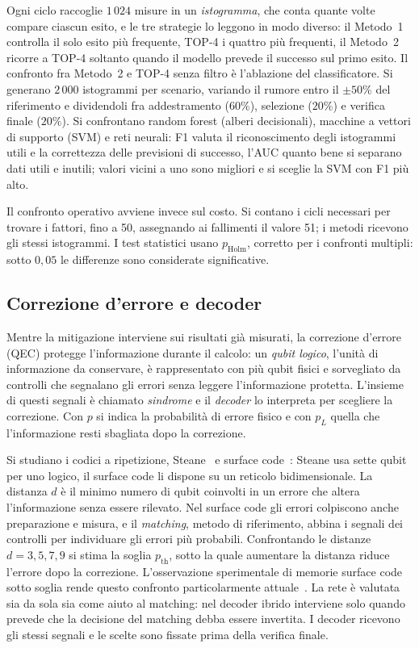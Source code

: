 Ogni ciclo raccoglie $1\,024$ misure in un \emph{istogramma}, che conta quante
volte compare ciascun esito, e le tre strategie lo leggono in modo diverso: il
Metodo~1 controlla il solo esito più frequente, TOP-4 i quattro più frequenti, il
Metodo~2 ricorre a TOP-4 soltanto quando il modello prevede il successo sul primo
esito.
Il confronto fra Metodo~2 e TOP-4 senza filtro è l'ablazione del classificatore.
Si generano $2\,000$ istogrammi per scenario, variando il rumore entro il
$\pm50\%$ del riferimento e dividendoli fra addestramento ($60\%$), selezione
($20\%$) e verifica finale ($20\%$).
Si confrontano random forest (alberi decisionali), macchine a vettori di supporto
(SVM) e reti neurali: F1 valuta il riconoscimento degli istogrammi utili e la
correttezza delle previsioni di successo, l'AUC quanto bene si separano dati
utili e inutili; valori vicini a uno sono migliori e si sceglie la SVM con F1 più
alto.

Il confronto operativo avviene invece sul costo.
Si contano i cicli necessari per trovare i fattori, fino a 50, assegnando ai
fallimenti il valore 51; i metodi ricevono gli stessi istogrammi.
I test statistici usano $p_{\mathrm{Holm}}$, corretto per i confronti multipli:
sotto $0{,}05$ le differenze sono considerate significative.

\subsection*{Correzione d'errore e decoder}

Mentre la mitigazione interviene sui risultati già misurati, la correzione
d'errore (QEC) protegge l'informazione durante il calcolo: un \emph{qubit
logico}, l'unità di informazione da conservare, è rappresentato con più qubit
fisici e sorvegliato da controlli che segnalano gli errori senza leggere
l'informazione protetta.
L'insieme di questi segnali è chiamato \emph{sindrome} e il \emph{decoder} lo
interpreta per scegliere la correzione.
Con $p$ si indica la probabilità di errore fisico e con $p_L$ quella che
l'informazione resti sbagliata dopo la correzione.

Si studiano i codici a ripetizione, Steane~\cite{steane1996} e surface
code~\cite{fowler2012}: Steane usa sette qubit per uno logico, il surface code li
dispone su un reticolo bidimensionale.
La distanza $d$ è il minimo numero di qubit coinvolti in un errore che altera
l'informazione senza essere rilevato.
Nel surface code gli errori colpiscono anche preparazione e misura, e il
\emph{matching}, metodo di riferimento, abbina i segnali dei controlli per
individuare gli errori più probabili.
Confrontando le distanze $d=3,5,7,9$ si stima la soglia $p_{\mathrm{th}}$, sotto
la quale aumentare la distanza riduce l'errore dopo la correzione.
L'osservazione sperimentale di memorie surface code sotto soglia rende questo
confronto particolarmente attuale~\cite{googleQECBelowThreshold2025}.
La rete è valutata sia da sola sia come aiuto al matching: nel decoder ibrido
interviene solo quando prevede che la decisione del matching debba essere
invertita.
I decoder ricevono gli stessi segnali e le scelte sono fissate prima della
verifica finale.

